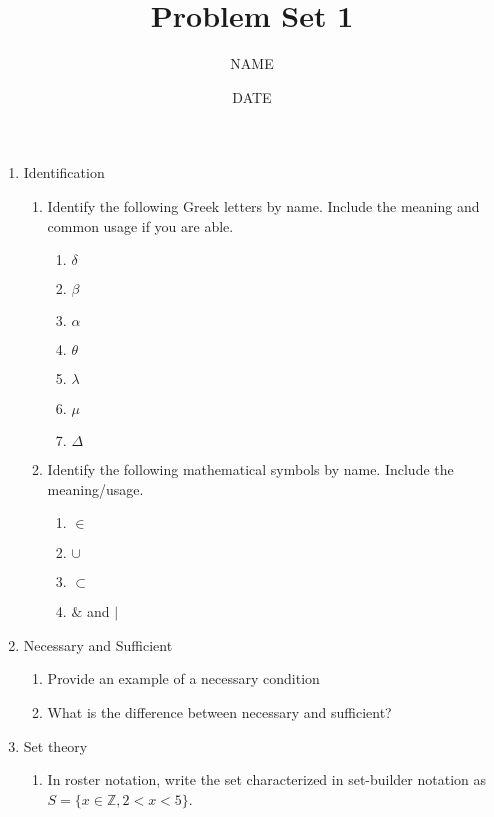 \documentclass[12pt,thmsa]{article}
\title{Problem Set 1}
\author{NAME}
\date{DATE}
\begin{document}
\doublespacing
\maketitle

\begin{enumerate}
\item Identification
\begin{enumerate}
\item Identify the following Greek letters by name. Include the meaning and common usage if you are able. 
\begin{enumerate}
\item $\delta$

\item $\beta$

\item $\alpha$

\item $\theta$

\item $\lambda$

\item $\mu$

\item $\Delta$
\end{enumerate}

\item Identify the following mathematical symbols by name. Include the meaning/usage. 
\begin{enumerate}
\item $\in$

\item $\cup$

\item $\subset$

\item $\&$ and $|$ 
\end{enumerate}
\end{enumerate}

\item Necessary and Sufficient
\begin{enumerate}
\item Provide an example of a necessary condition 

\item What is the difference between necessary and sufficient?
\end{enumerate}

\item Set theory
\begin{enumerate}
\item In roster notation, write the set characterized in set-builder notation as $S = \{x \in \mathbb{Z}, 2 <x <5\}$.


\end{enumerate}
\end{enumerate}
\end{document}
